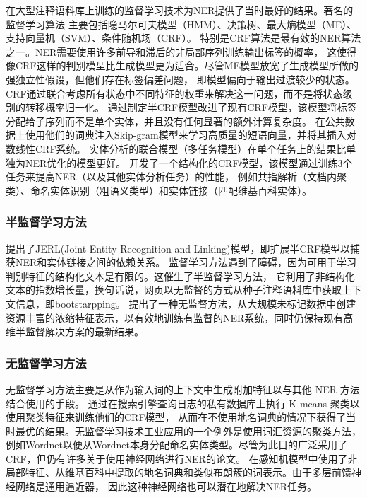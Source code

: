 在大型注释语料库上训练的监督学习技术为NER提供了当时最好的结果。著名的监督学习算法
主要包括隐马尔可夫模型（HMM）、决策树、最大熵模型（ME）、支持向量机（SVM）、条件随机场（CRF）。
特别是CRF算法是最有效的NER算法之一。NER需要使用许多前导和滞后的非局部序列训练输出标签的概率，
这使得像CRF这样的判别模型比生成模型更为适合。尽管ME模型放宽了生成模型所做的强独立性假设，但他们存在标签偏差问题，
即模型偏向于输出过渡较少的状态。CRF通过联合考虑所有状态中不同特征的权重来解决这一问题，而不是将状态级别的转移概率归一化。
\parencite{sarawagi2004semi}通过制定半CRF模型改进了现有CRF模型，该模型将标签分配给子序列而不是单个实体，并且没有任何显著的额外计算复杂度。
\parencite{passos2014lexicon}在公共数据上使用他们的词典注入Skip-gram模型来学习高质量的短语向量，并将其插入对数线性CRF系统。
实体分析的联合模型（多任务模型）在单个任务上的结果比单独为NER优化的模型更好。
\parencite{durrett2014joint}开发了一个结构化的CRF模型，该模型通过训练3个任务来提高NER（以及其他实体分析任务）的性能，
例如共指解析（文档内聚类）、命名实体识别（粗语义类型）和实体链接（匹配维基百科实体）。



\subsubsection{半监督学习方法}

\parencite{luo2015joint}提出了JERL(Joint Entity Recognition and Linking)模型，即扩展半CRF模型以捕获NER和实体链接之间的依赖关系。
监督学习方法遇到了障碍，因为可用于学习判别特征的结构化文本是有限的。这催生了半监督学习方法，
它利用了非结构化文本的指数增长量，换句话说，网页以无监督的方式从种子注释语料库中获取上下文信息，即bootstarpping。
\parencite{luo2015joint}提出了一种无监督方法，从大规模未标记数据中创建资源丰富的浓缩特征表示，以有效地训练有监督的NER系统，同时仍保持现有高维半监督解决方案的最新结果。



\subsubsection{无监督学习方法}

无监督学习方法主要是从作为输入词的上下文中生成附加特征以与其他 NER 方法结合使用的手段。
\parencite{lin2009phrase}通过在搜索引擎查询日志的私有数据库上执行 K-means 聚类以使用聚类特征来训练他们的CRF模型，
从而在不使用地名词典的情况下获得了当时最优的结果。无监督学习技术工业应用的一个例外是使用词汇资源的聚类方法，
例如Wordnet以便从Wordnet本身分配命名实体类型。尽管为此目的广泛采用了CRF，但仍有许多关于使用神经网络进行NER的论文。
\parencite{ratinov2009design}在感知机模型中使用了非局部特征、从维基百科中提取的地名词典和类似布朗簇的词表示。由于多层前馈神经网络是通用逼近器，
因此这种神经网络也可以潜在地解决NER任务。


